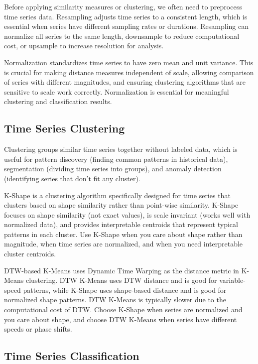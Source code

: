 Before applying similarity measures or clustering, we often need to preprocess time series data. Resampling adjusts time series to a consistent length, which is essential when series have different sampling rates or durations. Resampling can normalize all series to the same length, downsample to reduce computational cost, or upsample to increase resolution for analysis.

Normalization standardizes time series to have zero mean and unit variance. This is crucial for making distance measures independent of scale, allowing comparison of series with different magnitudes, and ensuring clustering algorithms that are sensitive to scale work correctly. Normalization is essential for meaningful clustering and classification results.

\subsection{Time Series Clustering}

Clustering groups similar time series together without labeled data, which is useful for pattern discovery (finding common patterns in historical data), segmentation (dividing time series into groups), and anomaly detection (identifying series that don't fit any cluster).

K-Shape is a clustering algorithm specifically designed for time series that clusters based on shape similarity rather than point-wise similarity. K-Shape focuses on shape similarity (not exact values), is scale invariant (works well with normalized data), and provides interpretable centroids that represent typical patterns in each cluster. Use K-Shape when you care about shape rather than magnitude, when time series are normalized, and when you need interpretable cluster centroids.

DTW-based K-Means uses Dynamic Time Warping as the distance metric in K-Means clustering. DTW K-Means uses DTW distance and is good for variable-speed patterns, while K-Shape uses shape-based distance and is good for normalized shape patterns. DTW K-Means is typically slower due to the computational cost of DTW. Choose K-Shape when series are normalized and you care about shape, and choose DTW K-Means when series have different speeds or phase shifts.

\subsection{Time Series Classification}

